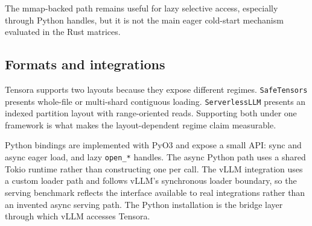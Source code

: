 The mmap-backed path remains useful for lazy selective access, especially through Python handles, but it is not the main eager cold-start mechanism evaluated in the Rust matrices.

\subsection{Formats and integrations}

Tensora supports two layouts because they expose different regimes. \texttt{SafeTensors} presents whole-file or multi-shard contiguous loading. \texttt{ServerlessLLM} presents an indexed partition layout with range-oriented reads. Supporting both under one framework is what makes the layout-dependent regime claim measurable.

Python bindings are implemented with PyO3 and expose a small API: sync and async eager load, and lazy \texttt{open\_*} handles. The async Python path uses a shared Tokio runtime rather than constructing one per call. The vLLM integration uses a custom loader path and follows vLLM's synchronous loader boundary, so the serving benchmark reflects the interface available to real integrations rather than an invented async serving path. The Python installation is the bridge layer through which vLLM accesses Tensora.
